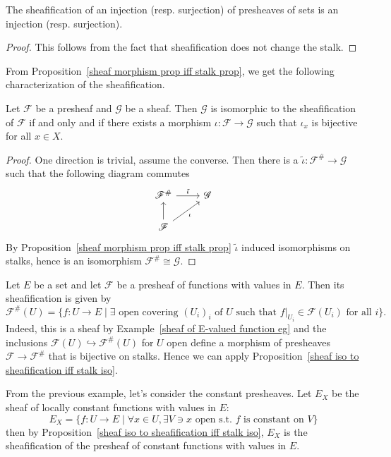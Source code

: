 \begin{proposition}\label{sheaf sheafification on morphism prop}
The sheafification of an injection (resp. surjection) of presheaves of sets is an injection (resp. surjection).
\end{proposition}
\begin{proof}
This follows from the fact that sheafification does not change the stalk.
\end{proof}
From Proposition~\ref{sheaf morphism prop iff stalk prop}, we get the following characterization of the sheafification.
\begin{proposition}\label{sheaf iso to sheafification iff stalk iso}
Let $\mathscr{F}$ be a presheaf and $\mathscr{G}$ be a sheaf. Then $\mathscr{G}$ is isomorphic to the sheafification of $\mathscr{F}$ if and only and if there exists a morphism $\iota:\mathscr{F}\to\mathscr{G}$ such that $\iota_x$ is bijective for all $x\in X$.
\end{proposition}
\begin{proof}
One direction is trivial, assume the converse. Then there is a $\tilde{\iota}:\mathscr{F}^{\#}\to\mathscr{G}$ such that the following diagram commutes
\[\begin{tikzcd}
\mathscr{F}^{\#}\ar[r,"\tilde{\iota}"]&\mathscr{G}\\
\mathscr{F}\ar[ru,swap,"\iota"]\ar[u]
\end{tikzcd}\]
By Proposition~\ref{sheaf morphism prop iff stalk prop} $\tilde{\iota}$ induced isomorphisms on stalks, hence is an isomorphism $\mathscr{F}^{\#}\cong\mathscr{G}$.
\end{proof}
\begin{example}\label{sheafification presheaf of function}
Let $E$ be a set and let $\mathscr{F}$ be a presheaf of functions with values in $E$. Then its sheafification is given by
\[\mathscr{F}^{\#}(U)=\{f:U\to E\mid\exists\text{ open covering $(U_i)_i$ of $U$ such that $f|_{U_i}\in\mathscr{F}(U_i)$ for all $i$}\}.\]
Indeed, this is a sheaf by Example~\ref{sheaf of E-valued function eg} and the inclusions $\mathscr{F}(U)\hookrightarrow\mathscr{F}^{\#}(U)$ for $U$ open define a morphism of presheaves $\mathscr{F}\to\mathscr{F}^{\#}$ that is bijective on stalks. Hence we can apply Proposition~\ref{sheaf iso to sheafification iff stalk iso}.
\end{example}
\begin{example}
From the previous example, let's consider the constant presheaves. Let $E_{X}$ be the sheaf of locally constant functions with values in $E$:
\[E_X=\{f:U\to E\mid \forall x\in U,\exists V\ni x\text{ open s.t. $f$ is constant on $V$}\}\]
then by Proposition~\ref{sheaf iso to sheafification iff stalk iso}, $E_X$ is the sheafification of the presheaf of constant functions with values in $E$.
\end{example}
